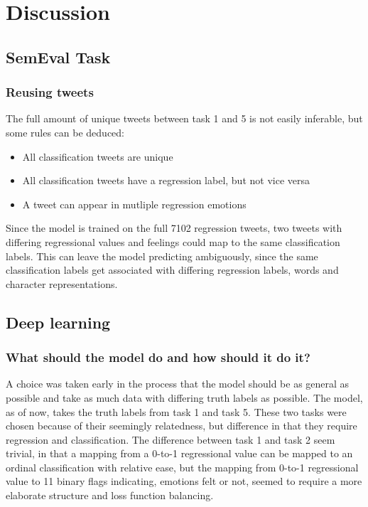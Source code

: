 
\section{Discussion}

\subsection{SemEval Task}

\subsubsection*{Reusing tweets}
The full amount of unique tweets between task 1 and 5 is not easily inferable, but some rules can be deduced:\\
\begin{itemize}
\item All classification tweets are unique
\item All classification tweets have a regression label, but not vice versa
\item A tweet can appear in mutliple regression emotions
\end{itemize}
Since the model is trained on the full 7102 regression tweets, two tweets with differing regressional values and feelings could map to the same classification labels. This can leave the model predicting ambiguously, since the same classification labels get associated with differing regression labels, words and character representations. 

\subsection{Deep learning}

\subsubsection*{What should the model do and how should it do it?}
A choice was taken early in the process that the model should be as general as possible and take as much data with differing truth labels as possible. The model, as of now, takes the truth labels from task 1 and task 5. These two tasks were chosen because of their seemingly relatedness, but difference in that they require regression and classification. The difference between task 1 and task 2 seem trivial, in that a mapping from a 0-to-1 regressional value can be mapped to an ordinal classification with relative ease, but the mapping from 0-to-1 regressional value to 11 binary flags indicating, emotions felt or not, seemed to require a more elaborate structure and loss function balancing.\\

